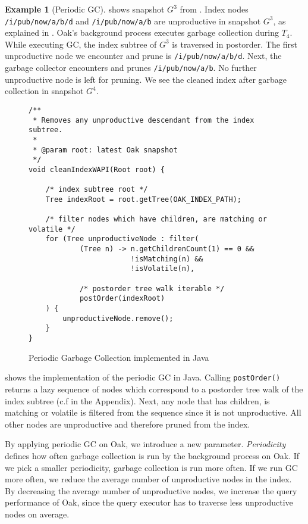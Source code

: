 \documentclass[abstracton,12pt]{scrartcl}
\theoremstyle{definition}
\newtheorem{example}{Example}
\begin{document}
\begin{example}[Periodic GC]
   shows snapshot $G^3$ from
  . Index nodes \texttt{/i/pub/now/a/b/d}
  and \texttt{/i/pub/now/a/b} are unproductive in snapshot $G^3$, as explained
  in . Oak's background process executes garbage
  collection during $T_4$. While executing GC, the index subtree of $G^3$ is
  traversed in postorder.
  The first unproductive node we encounter and prune is
  \texttt{/i/pub/now/a/b/d}. Next, the garbage collector encounters and prunes
  \texttt{/i/pub/now/a/b}. No further unproductive node is left for pruning. We
  see the cleaned index after garbage collection in snapshot $G^4$.
\end{example}

\begin{figure}[H]
  \small
  \begin{framed}
\begin{verbatim}
/**
 * Removes any unproductive descendant from the index subtree.
 *
 * @param root: latest Oak snapshot 
 */
void cleanIndexWAPI(Root root) {

    /* index subtree root */
    Tree indexRoot = root.getTree(OAK_INDEX_PATH);

    /* filter nodes which have children, are matching or volatile */
    for (Tree unproductiveNode : filter(
            (Tree n) -> n.getChildrenCount(1) == 0 &&
                        !isMatching(n) &&
                        !isVolatile(n),

            /* postorder tree walk iterable */
            postOrder(indexRoot)
    ) {
        unproductiveNode.remove();
    }
}
\end{verbatim}
  \end{framed}
  \caption[Periodic GC implemented in Java]{Periodic Garbage Collection
    implemented in Java}
  \label{fig:java_periodic_gc}
\end{figure}

 shows the implementation of the periodic
GC in Java. Calling \texttt{postOrder()} returns a lazy sequence of nodes
which correspond to a postorder tree walk of the index subtree (c.f
 in the Appendix). Next, any node
that has children, is matching or volatile is
filtered from the sequence since it is not unproductive. All other nodes are
unproductive and therefore pruned from the index.

By applying periodic GC on Oak, we introduce a new
parameter. \textit{Periodicity} defines how often garbage collection is run by
the background process on Oak. If we pick a smaller
periodicity, garbage collection is run more often. If we run GC more often, we
reduce the average number of unproductive nodes in the index. By decreasing the
average number of unproductive nodes, we increase the query performance of Oak,
since the query executor has to traverse less unproductive nodes on average.
\end{document}
